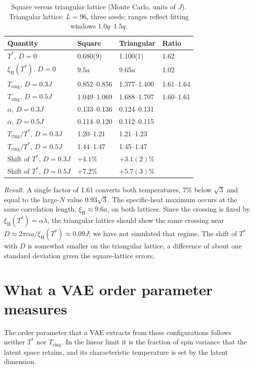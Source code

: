 \documentclass[prb,reprint,longbibliography,superscriptaddress,amsmath,amssymb]{revtex4-2}
\newcommand{\Ts}{T^{*}}
\newcommand{\Tr}{T_{\mathrm{ring}}}
\newcommand{\xiH}{\xi_{\mathrm{H}}}
\begin{document}
\begin{table}[tb]
\caption{Square versus triangular lattice (Monte Carlo, units of $J$). Triangular lattice: $L=96$, three seeds; ranges reflect fitting windows $1.0q$--$1.5q$.}
\label{tab:tri}
\begin{ruledtabular}
\begin{tabular}{llll}
Quantity & Square & Triangular & Ratio \\
\hline
$\Ts$, $D=0$ & 0.680(9) & 1.100(1) & 1.62 \\
$\xiH(\Ts)$, $D=0$ & $9.5a$ & $9.65a$ & 1.02 \\
$\Tr$, $D=0.3J$ & 0.852--0.856 & 1.377--1.400 & 1.61--1.64 \\
$\Tr$, $D=0.5J$ & 1.049--1.069 & 1.688--1.707 & 1.60--1.61 \\
$\alpha$, $D=0.3J$ & 0.133--0.136 & 0.124--0.131 & \\
$\alpha$, $D=0.5J$ & 0.114--0.120 & 0.112--0.115 & \\
$\Tr/\Ts$, $D=0.3J$ & 1.20--1.21 & 1.21--1.23 & \\
$\Tr/\Ts$, $D=0.5J$ & 1.44--1.47 & 1.45--1.47 & \\
Shift of $\Ts$, $D=0.3J$ & $+4.1\%$ & $+3.1(2)\%$ & \\
Shift of $\Ts$, $D=0.5J$ & $+7.2\%$ & $+5.7(3)\%$ & \\
\end{tabular}
\end{ruledtabular}
\end{table}

\textit{Result.} A single factor of 1.61 converts both temperatures, 7\% below $\sqrt3$ and equal to the large-$N$ value $0.93\sqrt3$. The specific-heat maximum occurs at the same correlation length, $\xiH\approx9.6a$, on both lattices. Since the crossing is fixed by $\xiH(\Ts)=\alpha\lambda$, the triangular lattice should show the same crossing near $D\approx2\pi\alpha a/\xiH(\Ts)\approx0.09J$; we have not simulated that regime. The shift of $\Ts$ with $D$ is somewhat smaller on the triangular lattice, a difference of about one standard deviation given the square-lattice errors.

\section{What a VAE order parameter measures}
\label{sec:vae}

The order parameter that a VAE extracts from these configurations follows neither $\Ts$ nor $\Tr$. In the linear limit it is the fraction of spin variance that the latent space retains, and its characteristic temperature is set by the latent dimension.
\end{document}
